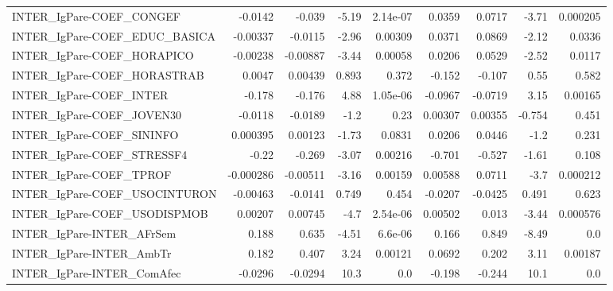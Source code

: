 \begin{tabular}{lrrrrrrrr}
INTER\_IgPare-COEF\_CONGEF              &     -0.0142 &       -0.039 &    -5.19 & 2.14e-07 &     0.0359 &      0.0717 &        -3.71 &      0.000205 \\
INTER\_IgPare-COEF\_EDUC\_BASICA         &    -0.00337 &      -0.0115 &    -2.96 &  0.00309 &     0.0371 &      0.0869 &        -2.12 &        0.0336 \\
INTER\_IgPare-COEF\_HORAPICO            &    -0.00238 &     -0.00887 &    -3.44 &  0.00058 &     0.0206 &      0.0529 &        -2.52 &        0.0117 \\
INTER\_IgPare-COEF\_HORASTRAB           &      0.0047 &      0.00439 &    0.893 &    0.372 &     -0.152 &      -0.107 &         0.55 &         0.582 \\
INTER\_IgPare-COEF\_INTER               &      -0.178 &       -0.176 &     4.88 & 1.05e-06 &    -0.0967 &     -0.0719 &         3.15 &       0.00165 \\
INTER\_IgPare-COEF\_JOVEN30             &     -0.0118 &      -0.0189 &     -1.2 &     0.23 &    0.00307 &     0.00355 &       -0.754 &         0.451 \\
INTER\_IgPare-COEF\_SININFO             &    0.000395 &      0.00123 &    -1.73 &   0.0831 &     0.0206 &      0.0446 &         -1.2 &         0.231 \\
INTER\_IgPare-COEF\_STRESSF4            &       -0.22 &       -0.269 &    -3.07 &  0.00216 &     -0.701 &      -0.527 &        -1.61 &         0.108 \\
INTER\_IgPare-COEF\_TPROF               &   -0.000286 &     -0.00511 &    -3.16 &  0.00159 &    0.00588 &      0.0711 &         -3.7 &      0.000212 \\
INTER\_IgPare-COEF\_USOCINTURON         &    -0.00463 &      -0.0141 &    0.749 &    0.454 &    -0.0207 &     -0.0425 &        0.491 &         0.623 \\
INTER\_IgPare-COEF\_USODISPMOB          &     0.00207 &      0.00745 &     -4.7 & 2.54e-06 &    0.00502 &       0.013 &        -3.44 &      0.000576 \\
INTER\_IgPare-INTER\_AFrSem             &       0.188 &        0.635 &    -4.51 &  6.6e-06 &      0.166 &       0.849 &        -8.49 &           0.0 \\
INTER\_IgPare-INTER\_AmbTr              &       0.182 &        0.407 &     3.24 &  0.00121 &     0.0692 &       0.202 &         3.11 &       0.00187 \\
INTER\_IgPare-INTER\_ComAfec            &     -0.0296 &      -0.0294 &     10.3 &      0.0 &     -0.198 &      -0.244 &         10.1 &           0.0 \\

\end{tabular}
